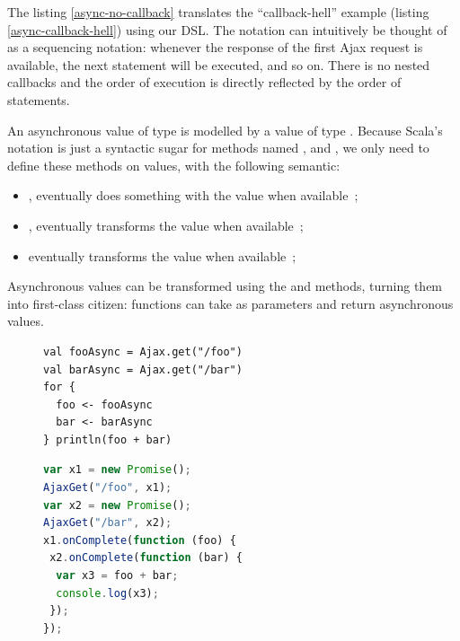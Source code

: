 \documentclass[american,english,runningheads]{llncs}
\begin{document}
The listing \ref{async-no-callback} translates the “callback-hell” example (listing \ref{async-callback-hell}) using our DSL. The  notation can intuitively be thought of as a sequencing notation: whenever the response of the first Ajax request is available, the next statement will be executed, and so on. There is no nested callbacks and the order of execution is directly reflected by the order of statements.

An asynchronous value of type  is modelled by a value of type . Because Scala’s  notation is just a syntactic sugar for methods named ,  and , we only need to define these methods on  values, with the following semantic:
\begin{itemize}
\item {}, eventually does something with the value when available~;
\item {}, eventually transforms the value when available~;
\item {} eventually transforms the value when available~;
\end{itemize}

Asynchronous values can be transformed using the  and  methods, turning them into first-class citizen: functions can take as parameters and return asynchronous values.

\begin{figure}
\begin{multicols}{2}
\begin{lstlisting}[caption=Parallel computations in Scala,label=async-parallel-1]
val fooAsync = Ajax.get("/foo")
val barAsync = Ajax.get("/bar")
for {
  foo <- fooAsync
  bar <- barAsync
} println(foo + bar)
\end{lstlisting}
\vfill
\columnbreak
\begin{lstlisting}[language=JavaScript,caption=Generated JavaScript code,label=async-parallel-2]
var x1 = new Promise();
AjaxGet("/foo", x1);
var x2 = new Promise();
AjaxGet("/bar", x2);
x1.onComplete(function (foo) {
 x2.onComplete(function (bar) {
  var x3 = foo + bar;
  console.log(x3);
 });
});
\end{lstlisting}
\end{multicols}
\end{figure}
\end{document}
